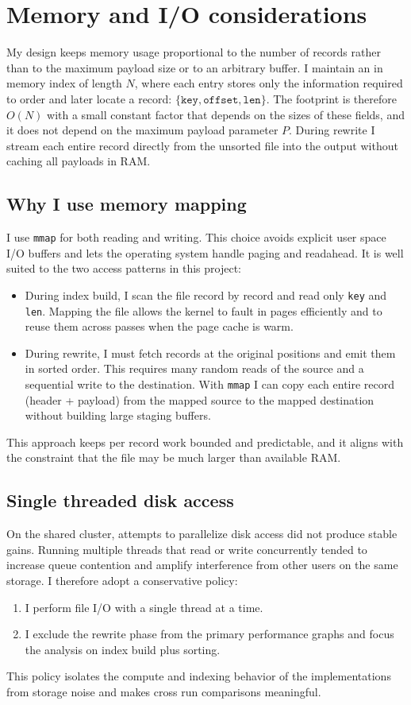 \documentclass[12pt]{article}
\begin{document}
\section{Memory and I/O considerations}
My design keeps memory usage proportional to the number of records rather than to the maximum payload size or to an arbitrary buffer. I maintain an in memory index of length \(N\), where each entry stores only the information required to order and later locate a record: \(\{\texttt{key}, \texttt{offset}, \texttt{len}\}\). The footprint is therefore \(O(N)\) with a small constant factor that depends on the sizes of these fields, and it does not depend on the maximum payload parameter \(P\). During rewrite I stream each entire record directly from the unsorted file into the output without caching all payloads in RAM.

\subsection{Why I use memory mapping}
I use \texttt{mmap} for both reading and writing. This choice avoids explicit user space I/O buffers and lets the operating system handle paging and readahead. It is well suited to the two access patterns in this project:
\begin{itemize}
  \item During index build, I scan the file record by record and read only \texttt{key} and \texttt{len}. Mapping the file allows the kernel to fault in pages efficiently and to reuse them across passes when the page cache is warm.
  \item During rewrite, I must fetch records at the original positions and emit them in sorted order. This requires many random reads of the source and a sequential write to the destination. With \texttt{mmap} I can copy each entire record (header + payload) from the mapped source to the mapped destination without building large staging buffers.
\end{itemize}
This approach keeps per record work bounded and predictable, and it aligns with the constraint that the file may be much larger than available RAM.

\subsection{Single threaded disk access}
On the shared cluster, attempts to parallelize disk access did not produce stable gains. Running multiple threads that read or write concurrently tended to increase queue contention and amplify interference from other users on the same storage. I therefore adopt a conservative policy:
\begin{enumerate}
  \item I perform file I/O with a single thread at a time.
  \item I exclude the rewrite phase from the primary performance graphs and focus the analysis on index build plus sorting.
\end{enumerate}
This policy isolates the compute and indexing behavior of the implementations from storage noise and makes cross run comparisons meaningful.
\end{document}
